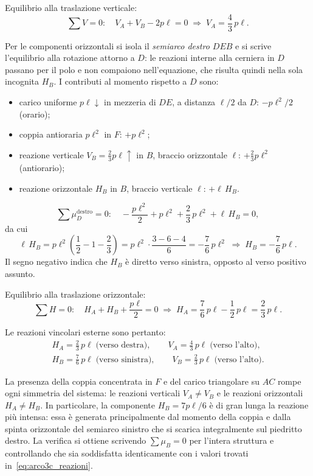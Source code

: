 \medskip
\noindent Equilibrio alla traslazione verticale:
\[
\sum V = 0:\quad
V_A + V_B - 2p\ell = 0
\;\Rightarrow\;
V_A = \frac{4}{3}\,p\ell.
\]

\medskip
\noindent Per le componenti orizzontali si isola
il \emph{semiarco destro $DEB$} e si scrive
l'equilibrio alla rotazione attorno a $D$:
le reazioni interne alla cerniera in $D$ passano
per il polo e non compaiono nell'equazione,
che risulta quindi nella sola incognita $H_B$.
I contributi al momento rispetto a $D$ sono:

\begin{itemize}[noitemsep]
	\item carico uniforme $p\ell\downarrow$ in mezzeria
	di $DE$, a distanza $\ell/2$ da $D$:
	$-p\ell^2/2$ (orario);
	\item coppia antioraria $p\ell^2$ in $F$:
	$+p\ell^2$;
	\item reazione verticale $V_B = \tfrac{2}{3}p\ell\uparrow$
	in $B $, braccio orizzontale $\ell$:
	$+\tfrac{2}{3}p\ell^2$ (antiorario);
	\item reazione orizzontale $H_B$ in $B$,
	braccio verticale $\ell$:
	$+\ell\,H_B$.
\end{itemize}

\[
\sum \mu_D^{\text{destro}} = 0:\quad
-\frac{p\ell^2}{2}
+ p\ell^2
+ \frac{2}{3}\,p\ell^2
+ \ell\,H_B
= 0,
\]
da cui
\[
\ell\,H_B
= p\ell^2\!\left(\frac{1}{2} - 1 - \frac{2}{3}\right)
= p\ell^2\cdot\frac{3 - 6 - 4}{6}
= -\frac{7}{6}\,p\ell^2
\;\Rightarrow\;
H_B = -\frac{7}{6}\,p\ell.
\]
Il segno negativo indica che $H_B$ è diretto verso sinistra,
opposto al verso positivo assunto.

\medskip
\noindent Equilibrio alla traslazione orizzontale:
\[
\sum H = 0:\quad
H_A + H_B + \frac{p\ell}{2} = 0
\;\Rightarrow\;
H_A = \frac{7}{6}\,p\ell - \frac{1}{2}\,p\ell
= \frac{2}{3}\,p\ell.
\]

Le reazioni vincolari esterne sono pertanto:
\begin{equation}\label{eq:arco3c_reazioni}
	\begin{gathered}
		H_A = \frac{2}{3}\,p\ell
		\;\text{(verso destra)},
		\qquad
		V_A = \frac{4}{3}\,p\ell
		\;\text{(verso l'alto)},
		\\[4pt]
		H_B = \frac{7}{6}\,p\ell
		\;\text{(verso sinistra)},
		\qquad
		V_B = \frac{2}{3}\,p\ell
		\;\text{(verso l'alto)}.
	\end{gathered}
\end{equation}

\begin{oss}
	La presenza della coppia concentrata in $F$ e del
	carico triangolare su $AC$ rompe ogni simmetria
	del sistema: le reazioni verticali $V_A \neq V_B$
	e le reazioni orizzontali $H_A \neq H_B$.
	In particolare, la componente $H_B = 7p\ell/6$
	è di gran lunga la reazione più intensa:
	essa è generata principalmente dal momento della
	coppia e dalla spinta orizzontale del semiarco
	sinistro che si scarica integralmente sul piedritto
	destro.
	La verifica si ottiene scrivendo $\sum\mu_B = 0$
	per l'intera struttura e controllando che sia
	soddisfatta identicamente con i valori
	trovati in~\eqref{eq:arco3c_reazioni}.
\end{oss}

